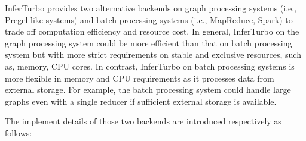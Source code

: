 \documentclass[conference]{IEEEtran}
\begin{document}
InferTurbo provides two alternative backends on graph processing systems (i.e., Pregel-like systems) and batch processing systems (i.e., MapReduce, Spark) to trade off computation efficiency and resource cost.
In general, InferTurbo on the graph processing system could be more efficient than that on batch processing system but with more strict requirements on stable and exclusive resources, such as, memory, CPU cores.
In contrast, InferTurbo on batch processing systems is more flexible in memory and CPU requirements as it processes data from external storage.
For example, the batch processing system could handle large graphs even with a single reducer if sufficient external storage is available.

The implement details of those two backends are introduced respectively as follows:

\end{document}
